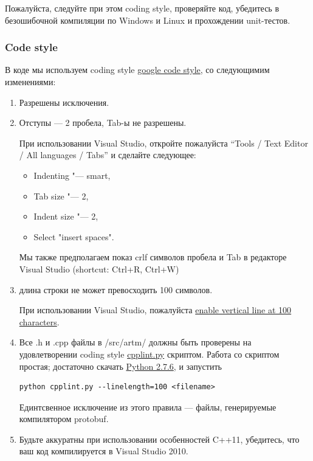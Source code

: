 \documentclass[12pt]{article}
\begin{document}
Пожалуйста, следуйте при этом coding style, проверяйте код, убедитесь в безошибочной компиляции по Windows и Linux и прохождении unit-тестов.

\subsubsection{Code style}

В коде мы используем coding style
\href{http://google-styleguide.googlecode.com/svn/trunk/cppguide.xml}{google code style},
со следующимим изменениями:
\begin{enumerate}
    \item Разрешены исключения.
    \item Отступы --- 2 пробела, Tab-ы не разрешены.

      При использовании Visual Studio,
      откройте пожалуйста ``Tools / Text Editor / All languages / Tabs''
      и сделайте следующее:
      \begin{itemize}
          \item Indenting "--- smart,
          \item Tab size "--- 2,
          \item Indent size "--- 2,
          \item Select "insert spaces".
      \end{itemize}

      Мы также предполагаем показ crlf символов пробела и Tab
      в редакторе Visual Studio (shortcut: Ctrl+R, Ctrl+W)

\item длина строки не может превосходить 100 символов.

      При использовании Visual Studio, пожалуйста \href{http://stackoverflow.com/questions/9894397/100-characters-line-marker-in-visual-studio}{enable
       vertical line at 100 characters}.

\item Все .h и .cpp файлы в /src/artm/ должны быть проверены на удовлетворении coding style 
      \href{http://google-styleguide.googlecode.com/svn/trunk/cpplint/cpplint.py}{cpplint.py} скриптом.
      Работа со скриптом простая; достаточно скачать
      \href{http://www.python.org/downloads/}{Python 2.7.6}, и запустить 

\begin{verbatim}
python cpplint.py --linelength=100 <filename>
\end{verbatim}
      Единтсвенное исключение из этого правила --- файлы, генерируемые компилятором protobuf.
      
\item Будьте аккуратны при использовании особенностей C++11, убедитесь, что ваш код компилируется в Visual Studio 2010.

\end{enumerate}
\end{document}
